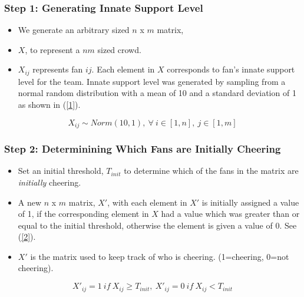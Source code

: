 \documentclass[compress,handout,10pt]{beamer}
\let\olditem\item
\renewcommand{\item}{\setlength{\itemsep}{0.5\baselineskip}\olditem}
\begin{document}
\begin{frame}
\frametitle{ Step 1: Generating Innate Support Level}
\begin{itemize}
\item We generate an arbitrary sized $n$ x $m$ matrix,
\item  $X$, to represent a $nm$ sized crowd.
\item   $X_{ij}$ represents fan $ij$. Each element in $X$ corresponds to fan's innate support level for the team.
Innate support level was generated by sampling from a normal random distribution with a mean of 10 and a standard deviation of 1 as shown in (\ref{1}).
\end{itemize} 
\begin{equation}
X_{ij}\sim Norm(10,1),~\forall~i\in[1,n],~j\in[1,m]
\label{1}
\end{equation}
\end{frame}

\begin{frame}
\frametitle{Step 2: Determinining Which Fans are Initially Cheering}
\begin{itemize}
\item Set an initial threshold, $T_{init}$ to determine which of the fans in the matrix are \textit{initially} cheering.
\item A new $n$ x $m$ matrix, $X'$, with each element in $X'$ is initially assigned a value of 1, if the corresponding element in $X$ had a value which was greater than or equal to the initial threshold, otherwise the element is given a value of 0. See (\ref{2}). 
\item $X'$ is the matrix used to keep track of who is cheering. (1=cheering, 0=not cheering). 
\end{itemize}
\begin{equation}
X'_{ij}=1~if~X_{ij}\geq T_{init},~X'_{ij}=0~if~X_{ij}<T_{init}
\label{2}
\end{equation}
\end{frame}
\end{document}
